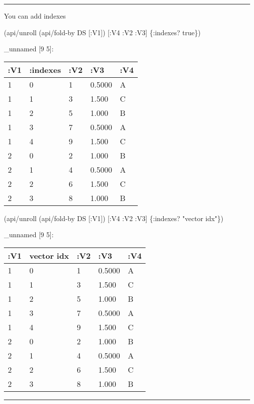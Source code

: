 \documentclass[]{article}
\newenvironment{Shaded}{\begin{snugshade}}{\end{snugshade}}
\newcommand{\AttributeTok}[1]{\textcolor[rgb]{0.77,0.63,0.00}{#1}}
\newcommand{\NormalTok}[1]{#1}
\newcommand{\StringTok}[1]{\textcolor[rgb]{0.31,0.60,0.02}{#1}}
\newcommand{\VariableTok}[1]{\textcolor[rgb]{0.00,0.00,0.00}{#1}}
\begin{document}
\begin{center}\rule{0.5\linewidth}{0.5pt}\end{center}

You can add indexes

\begin{Shaded}
\begin{Highlighting}[]
\NormalTok{(api/unroll (api/fold-by DS [}\AttributeTok{:V1}\NormalTok{]) [}\AttributeTok{:V4} \AttributeTok{:V2} \AttributeTok{:V3}\NormalTok{] \{}\AttributeTok{:indexes}\NormalTok{? }\VariableTok{true}\NormalTok{\})}
\end{Highlighting}
\end{Shaded}

\_unnamed {[}9 5{]}:

\begin{longtable}[]{@{}lllll@{}}
\toprule
:V1 & :indexes & :V2 & :V3 & :V4\tabularnewline
\midrule
\endhead
1 & 0 & 1 & 0.5000 & A\tabularnewline
1 & 1 & 3 & 1.500 & C\tabularnewline
1 & 2 & 5 & 1.000 & B\tabularnewline
1 & 3 & 7 & 0.5000 & A\tabularnewline
1 & 4 & 9 & 1.500 & C\tabularnewline
2 & 0 & 2 & 1.000 & B\tabularnewline
2 & 1 & 4 & 0.5000 & A\tabularnewline
2 & 2 & 6 & 1.500 & C\tabularnewline
2 & 3 & 8 & 1.000 & B\tabularnewline
\bottomrule
\end{longtable}

\begin{Shaded}
\begin{Highlighting}[]
\NormalTok{(api/unroll (api/fold-by DS [}\AttributeTok{:V1}\NormalTok{]) [}\AttributeTok{:V4} \AttributeTok{:V2} \AttributeTok{:V3}\NormalTok{] \{}\AttributeTok{:indexes}\NormalTok{? }\StringTok{"vector idx"}\NormalTok{\})}
\end{Highlighting}
\end{Shaded}

\_unnamed {[}9 5{]}:

\begin{longtable}[]{@{}lllll@{}}
\toprule
:V1 & vector idx & :V2 & :V3 & :V4\tabularnewline
\midrule
\endhead
1 & 0 & 1 & 0.5000 & A\tabularnewline
1 & 1 & 3 & 1.500 & C\tabularnewline
1 & 2 & 5 & 1.000 & B\tabularnewline
1 & 3 & 7 & 0.5000 & A\tabularnewline
1 & 4 & 9 & 1.500 & C\tabularnewline
2 & 0 & 2 & 1.000 & B\tabularnewline
2 & 1 & 4 & 0.5000 & A\tabularnewline
2 & 2 & 6 & 1.500 & C\tabularnewline
2 & 3 & 8 & 1.000 & B\tabularnewline
\bottomrule
\end{longtable}

\begin{center}\rule{0.5\linewidth}{0.5pt}\end{center}
\end{document}
